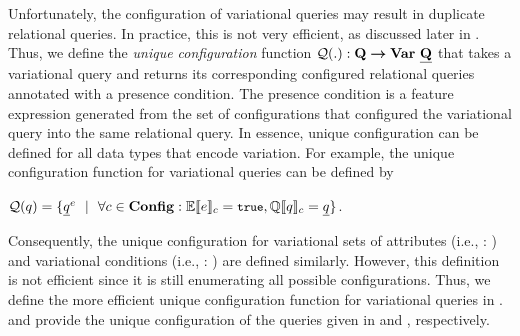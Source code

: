 \begin{example}
\label{eg:vq-sem}
\end{example}


Unfortunately, the configuration of variational queries may result in
duplicate relational queries. In practice, this is not very efficient, as discussed
later in . Thus, we define the \emph{unique configuration} function
$\qGroup . : \qSet \totype \vartype \pQSet$ that takes a variational query 
and returns its corresponding configured relational queries annotated with
a presence condition. The presence condition is a feature expression generated from
the set of configurations that configured the variational query into the same relational query.
%
In essence, unique configuration can be defined for all data types that encode variation.
For example, the unique configuration function for 
variational queries can be defined by \\
%
\centerline{
\ensuremath{
\qGroup \vQ = \setDef {\annot \pQ \myOR \forall \config \in \confSet: \fSem \dimMeta = \t,
\eeSem \vQ = \pQ}
}.}
Consequently, the unique configuration for variational sets of attributes (i.e.,
\aGroup [.] : \vAttSet \totype {\vartype {\bm{(}\settype \attnametype \bm{)}}})
and variational conditions (i.e., \cGroup [.] : \vCondSet \totype \vartype \pCondSet) are
defined similarly.
However, this definition is not efficient since it is still enumerating all possible 
configurations. Thus, we define the more efficient unique configuration function
for variational queries in .
%
 and  provide the unique configuration of the queries 
given in  and , respectively.



\begin{example}
\label{eg:group-vq}
\end{example}

\begin{example}
\label{eg:vq-group}
\end{example}



